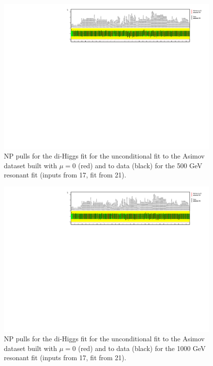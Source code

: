 \begin{figure}
\centering
\includegraphics[angle=270]{figures/results/HH/HadHad/HadHadFit21062021/PullsAndRankings/NP_allExceptGammas_2HDM500.pdf}
\caption{NP pulls for the di-Higgs \hadhad fit for the unconditional  fit to the Asimov dataset built with $\mu=0$ (red) and to data (black) for the 500 GeV  resonant fit (inputs from 17, fit from 21).}
\label{fig:HadHadPostfitNPPulls2HDM500}
\end{figure}

\begin{figure}
\centering
\includegraphics[angle=270]{figures/results/HH/HadHad/HadHadFit21062021/PullsAndRankings/NP_allExceptGammas_2HDM1000.pdf}
\caption{NP pulls for the di-Higgs \hadhad fit for the unconditional fit to the Asimov dataset built with $\mu=0$ (red) and to data (black) for the 1000 GeV resonant fit (inputs from 17, fit from 21).}
\label{fig:HadHadPostfitNPPulls2HDM1000}
\end{figure}

